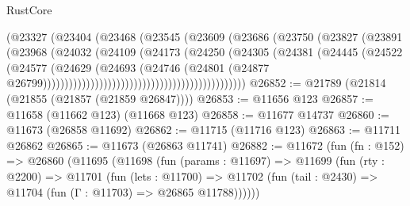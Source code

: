 \begin{lexlean}{RustCore}
\begin{coremodule}
                                                  (@23327
                                                    (@23404
                                                      (@23468
                                                        (@23545
                                                          (@23609
                                                            (@23686
                                                              (@23750
                                                                (@23827
                                                                  (@23891
                                                                    (@23968
                                                                      (@24032
                                                                        (@24109
                                                                          (@24173
                                                                            (@24250
                                                                              (@24305
                                                                                (@24381
                                                                                  (@24445
                                                                                    (@24522
                                                                                      (@24577
                                                                                        (@24629
                                                                                          (@24693
                                                                                            (@24746
                                                                                              (@24801
                                                                                                (@24877
                                                                                                  @26799)))))))))))))))))))))))))))))))))))))))))))))))
@26852 := @21789 (@21814 (@21855 (@21857 (@21859 @26847))))
@26853 := @11656 @123
@26857 := @11658 (@11662 @123) (@11668 @123)
@26858 := @11677 @14737
@26860 := @11673 (@26858 @11692)
@26862 := @11715 (@11716 @123)
@26863 := @11711 @26862
@26865 := @11673 (@26863 @11741)
@26882 := @11672
    (fun (fn : @152) =>
    @26860
      (@11695
        (@11698
          (fun (params : @11697) =>
          @11699
            (fun (rty : @2200) =>
            @11701
              (fun (lets : @11700) =>
              @11702 (fun (tail : @2430) => @11704 (fun (Γ : @11703) => @26865 @11788))))))

\end{coremodule}
\end{lexlean}
